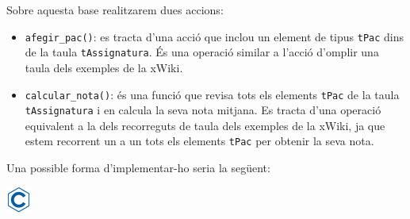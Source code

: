 \documentclass[
]{book}
\providecommand{\tightlist}{%
  \setlength{\itemsep}{0pt}\setlength{\parskip}{0pt}}
\begin{document}
Sobre aquesta base realitzarem dues accions:

\begin{itemize}
\tightlist
\item
  \texttt{afegir\_pac()}: es tracta d'una acció que inclou un element de tipus \texttt{tPac} dins de la taula \texttt{tAssignatura}. És una operació similar a l'acció d'omplir una taula dels exemples de la xWiki.
\item
  \texttt{calcular\_nota()}: és una funció que revisa tots els elements \texttt{tPac} de la taula \texttt{tAssignatura} i en calcula la seva nota mitjana. Es tracta d'una operació equivalent a la dels recorreguts de taula dels exemples de la xWiki, ja que estem recorrent un a un tots els elements \texttt{tPac} per obtenir la seva nota.
\end{itemize}

Una possible forma d'implementar-ho seria la següent:

\includegraphics{./img/c.png}
\end{document}
